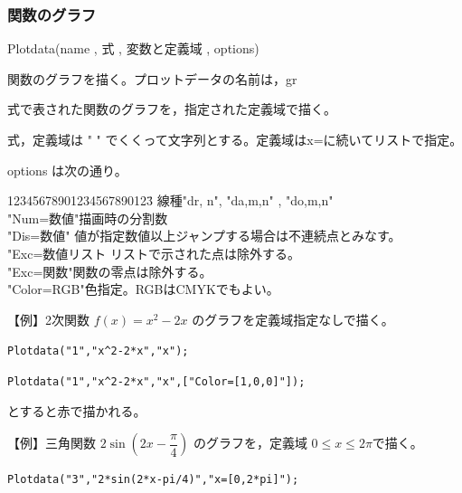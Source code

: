 \documentclass[papersize,a4paper,12pt,uplatex]{jsarticle}
\begin{document}
\subsubsection{関数のグラフ}
\begin{description}

\vspace{\baselineskip}
\hypertarget{plotdata}{}
\item[関数]Plotdata(name , 式 , 変数と定義域 , options)
\item[機能]関数のグラフを描く。プロットデータの名前は，gr
\item[説明]式で表された関数のグラフを，指定された定義域で描く。

式，定義域は " " でくくって文字列とする。定義域はx=に続いてリストで指定。

options は次の通り。
\begin{tabbing}
12345678901234567890123\=\kill
線種\>"dr, n", "da,m,n" , "do,m,n"\\
"Num=数値"\>描画時の分割数\\
"Dis=数値" \>値が指定数値以上ジャンプする場合は不連続点とみなす。\\
"Exc=数値リスト \>リストで示された点は除外する。\\
"Exc=関数"\>関数の零点は除外する。\\
"Color=RGB"\>色指定。RGBはCMYKでもよい。
\end{tabbing}

【例】2次関数 $f(x)=x^2-2x$ のグラフを定義域指定なしで描く。

\hspace{10mm}\verb|Plotdata("1","x^2-2*x","x");|

\vspace{\baselineskip}
\hspace{20mm} \scalebox{0.8}{}

 \verb|Plotdata("1","x^2-2*x","x",["Color=[1,0,0]"]);|

とすると赤で描かれる。

\vspace{\baselineskip}
【例】三角関数 $2\sin \left(2x-\dfrac{\pi}{4} \right)$ のグラフを，定義域 $0 \leq x \leq 2 \pi$で描く。

\hspace{10mm} \verb|Plotdata("3","2*sin(2*x-pi/4)","x=[0,2*pi]");|

\vspace{\baselineskip}
\hspace{20mm} 


\end{description}
\end{document}
